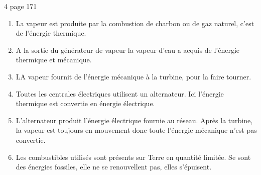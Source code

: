 \begin{myact}{4 page 171}
	\begin{enumerate}[label=\alph*)]
		\item La vapeur est produite par la combustion de charbon ou de gaz naturel, c'est de l'énergie thermique.\pause
		\item A la sortie du générateur de vapeur la vapeur d'eau a acquis de l'énergie thermique et mécanique.\pause
		\item LA vapeur fournit de l'énergie mécanique à la turbine, pour la faire tourner.\pause
		\item Toutes les centrales électriques utilisent un alternateur. Ici l'énergie thermique est convertie en énergie électrique.\pause
		\item L'alternateur produit l'énergie électrique fournie au réseau. Après la turbine, la vapeur est toujours en mouvement donc toute l'énergie mécanique n'est pas convertie.\pause
		\item Les combustibles utilisés sont présents sur Terre en quantité limitée. Se sont des énergies fossiles, elle ne se renouvellent pas, elles s'épuisent.
	\end{enumerate}
\end{myact}